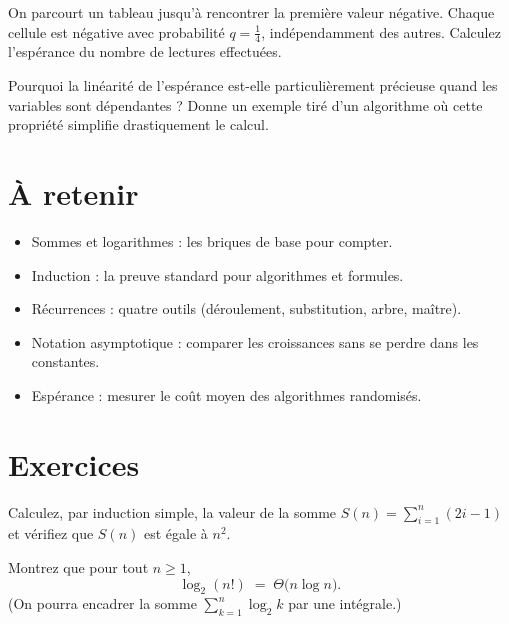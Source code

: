 \begin{exercice}
On parcourt un tableau jusqu’à rencontrer la première valeur négative.
Chaque cellule est négative avec probabilité $q=\tfrac14$, indépendamment
des autres.  Calculez l’espérance du nombre de lectures effectuées.
\end{exercice}

\begin{reflexion}
Pourquoi la linéarité de l’espérance est-elle particulièrement précieuse
quand les variables sont dépendantes ?  Donne un exemple tiré d’un
algorithme où cette propriété simplifie drastiquement le calcul.
\end{reflexion}

\section*{À retenir}

\begin{itemize}
  \item Sommes et logarithmes : les briques de base pour compter.
  \item Induction : la preuve standard pour algorithmes et formules.
  \item Récurrences : quatre outils (déroulement, substitution, arbre, maître).
  \item Notation asymptotique : comparer les croissances sans se perdre
        dans les constantes.
  \item Espérance : mesurer le coût moyen des algorithmes randomisés.
\end{itemize}

\section{Exercices}
\begin{exercice}
Calculez, par induction simple, la valeur de la somme
\(\displaystyle S(n)=\sum_{i=1}^{n}(2i-1)\)
et vérifiez que \(S(n)\) est égale à \(n^{2}\).  %
\end{exercice}

\begin{exercice}
Montrez que pour tout \(n\ge1\),
\[
\log_2(n!) \;=\; \Theta\!\bigl(n\log n\bigr).
\]
(On pourra encadrer la somme \(\sum_{k=1}^{n}\log_2 k\) par une intégrale.)  %
\end{exercice}


